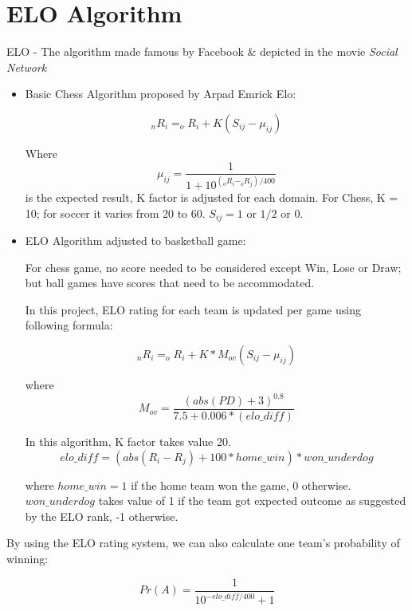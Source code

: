 \section{ELO Algorithm}


ELO - The algorithm made famous by Facebook \& depicted in the movie \textit{Social
Network}
\begin{itemize}
  \item Basic Chess Algorithm proposed by Arpad Emrick Elo:

\[ _{n}R_{i} = _{o}R_{i} + K(S_{ij} - \mu_{ij}) \]

Where 
\[ \mu_{ij} = \frac{1}{1+10^{(_{o}R_{i} - _{o}R_{j})/400}} \] is the expected
result, K factor is adjusted for each domain. For Chess, K = 10; for soccer it 
varies from 20 to 60. $S_{ij} = 1$ or $1/2$ or $0$.


  \item  ELO Algorithm adjusted to basketball game:


For chess game, no score needed to be considered except Win, Lose or Draw;
but ball games have scores that need to be accommodated.


In this project, ELO rating for each team is updated per game using following
formula:

\[ _{n}R_{i} = _{o}R_{i} + K*M_{ov}(S_{ij} - \mu_{ij}) \]


where 
\[ M_{ov} = \frac{(abs(PD) + 3)^{0.8}}{7.5 + 0.006*(elo\_diff)} \]


In this algorithm, K factor takes value 20. 
\[ elo\_diff = (abs(R_{i} - R_{j})+100*home\_win)*won\_underdog \]


where $home\_win = 1$ if the home team won the game, 0 otherwise. $won\_underdog$ 
takes value of 1 if the team got expected outcome as suggested by the ELO rank, -1 otherwise.

\end{itemize}

 
By using the ELO rating system, we can also calculate one team's probability
of winning:

\[ Pr(A) = \frac{1}{10 ^{-elo\_diff/400}+1} \]


